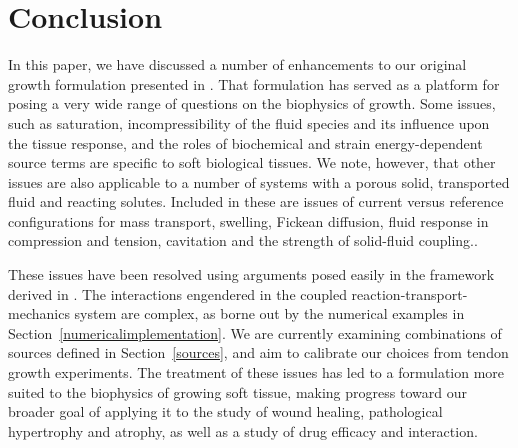 \section{Conclusion}
\label{sec:5}

In this paper, we have discussed a number of enhancements to our
original growth formulation presented in \citet{growthpaper}. That
formulation has served as a platform for posing a very wide range of
questions on the biophysics of growth. Some issues, such as
saturation, incompressibility of the fluid species and its influence
upon the tissue response, and the roles of biochemical and strain
energy-dependent source terms are specific to soft biological
tissues. We note, however, that other issues are also applicable to a
number of systems with a porous solid, transported fluid and reacting
solutes. Included in these are issues of current versus reference
configurations for mass transport, swelling, Fickean diffusion, fluid
response in compression and tension, cavitation and the strength of
solid-fluid coupling..

These issues have been resolved using arguments posed easily in the
framework derived in \citet{growthpaper}. The interactions engendered
in the coupled reaction-trans\-port-mechanics system are complex, as
borne out by the numerical examples in
Section~\ref{numericalimplementation}. We are currently examining
combinations of sources defined in Section~\ref{sources}, and aim to
calibrate our choices from tendon growth experiments. The treatment of
these issues has led to a formulation more suited to the biophysics of
growing soft tissue, making progress toward our broader goal of
applying it to the study of wound healing, pathological hypertrophy
and atrophy, as well as a study of drug efficacy and interaction.
